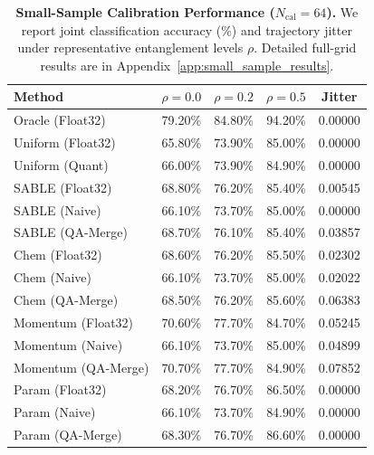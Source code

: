 \begin{table}[t]
\caption{\textbf{Small-Sample Calibration Performance ($N_{\text{cal}} = 64$).} We report joint classification accuracy (\%) and trajectory jitter under representative entanglement levels $\rho$. Detailed full-grid results are in Appendix~\ref{app:small_sample_results}.}
\label{tab:small_sample}
\vskip 0.1in
\begin{center}
\begin{footnotesize}
\begin{sc}
\setlength{\tabcolsep}{1.8pt}
\begin{tabular}{lcccc}
\toprule
Method & $\rho = 0.0$ & $\rho = 0.2$ & $\rho = 0.5$ & Jitter \\
\midrule
Oracle (Float32) & 79.20\% & 84.80\% & 94.20\% & 0.00000 \\
\midrule
Uniform (Float32) & 65.80\% & 73.90\% & 85.00\% & 0.00000 \\
Uniform (Quant) & 66.00\% & 73.90\% & 84.90\% & 0.00000 \\
\midrule
SABLE (Float32) & 68.80\% & 76.20\% & 85.40\% & 0.00545 \\
SABLE (Naive) & 66.10\% & 73.70\% & 85.00\% & 0.00000 \\
SABLE (QA-Merge) & 68.70\% & 76.10\% & 85.40\% & 0.03857 \\
\midrule
Chem (Float32) & 68.60\% & 76.20\% & 85.50\% & 0.02302 \\
Chem (Naive) & 66.10\% & 73.70\% & 85.00\% & 0.02022 \\
Chem (QA-Merge) & 68.50\% & 76.20\% & 85.60\% & 0.06383 \\
\midrule
Momentum (Float32) & 70.60\% & 77.70\% & 84.70\% & 0.05245 \\
Momentum (Naive) & 66.10\% & 73.70\% & 85.00\% & 0.04899 \\
Momentum (QA-Merge) & 70.70\% & 77.70\% & 84.90\% & 0.07852 \\
\midrule
Param (Float32) & 68.20\% & 76.70\% & 86.50\% & 0.00000 \\
Param (Naive) & 66.10\% & 73.70\% & 84.90\% & 0.00000 \\
Param (QA-Merge) & 68.30\% & 76.70\% & 86.60\% & 0.00000 \\
\bottomrule
\end{tabular}
\end{sc}
\end{footnotesize}
\end{center}
\vskip -0.1in
\end{table}


